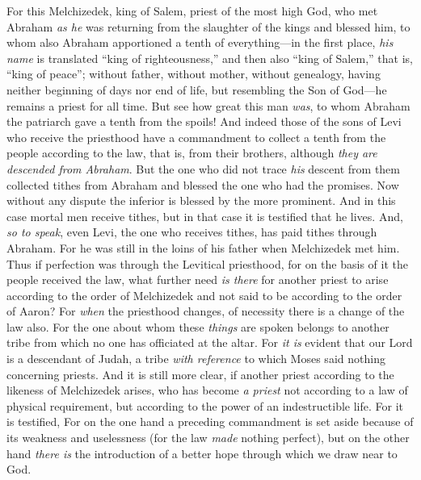 \begin{biblechapter} %
 For this Melchizedek, king of Salem, priest of the most high God, who met Abraham \textit{as he} was returning from the slaughter of the kings and blessed him,
\verse to whom also Abraham apportioned a tenth of everything—in the first place, \textit{his name} is translated “king of righteousness,” and then also “king of Salem,” that is, “king of peace”;
\verse without father, without mother, without genealogy, having neither beginning of days nor end of life, but resembling the Son of God—he remains a priest for all time.
\verse But see how great this man \textit{was}, to whom Abraham the patriarch gave a tenth from the spoils!
\verse And indeed those of the sons of Levi who receive the priesthood have a commandment to collect a tenth from the people according to the law, that is, from their brothers, although \textit{they are descended from Abraham}.
\verse But the one who did not trace \textit{his} descent from them collected tithes from Abraham and blessed the one who had the promises.
\verse Now without any dispute the inferior is blessed by the more prominent.
\verse And in this case mortal men receive tithes, but in that case it is testified that he lives.
\verse And, \textit{so to speak}, even Levi, the one who receives tithes, has paid tithes through Abraham.
\verse For he was still in the loins of his father when Melchizedek met him.
 Thus if perfection was through the Levitical priesthood, for on the basis of it the people received the law, what further need \textit{is there} for another priest to arise according to the order of Melchizedek and not said to be according to the order of Aaron?
\verse For \textit{when} the priesthood changes, of necessity there is a change of the law also.
\verse For the one about whom these \textit{things} are spoken belongs to another tribe from which no one has officiated at the altar.
\verse For \textit{it is} evident that our Lord is a descendant of Judah, a tribe \textit{with reference} to which Moses said nothing concerning priests.
\verse And it is still more clear, if another priest according to the likeness of Melchizedek arises,
\verse who has become \textit{a priest} not according to a law of physical requirement, but according to the power of an indestructible life.
\verse For it is testified,
\verse For on the one hand a preceding commandment is set aside because of its weakness and uselessness
\verse (for the law \textit{made} nothing perfect), but on the other hand \textit{there is} the introduction of a better hope through which we draw near to God.

\end{biblechapter}
